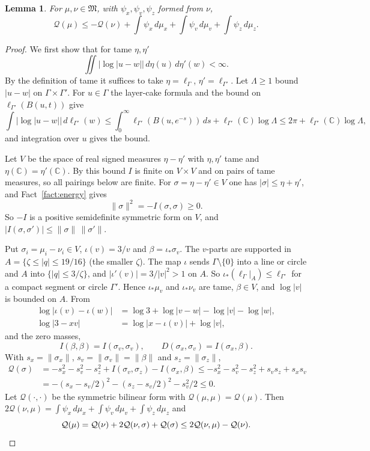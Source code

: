 \documentclass{amsart}
\newtheorem{lemma}{Lemma}[section]
\numberwithin{equation}{section}
\numberwithin{table}{section}
\begin{document}
\begin{lemma}\label{lem:concavity}
For $\mu,\nu\in\mathfrak M$, with $\psi_x,\psi_v,\psi_z$ formed from $\nu$,
\begin{equation}\label{eq:dual-inequality}
 \mathcal Q(\mu)\le-\mathcal Q(\nu)
            +\int\psi_x\,d\mu_x+\int\psi_v\,d\mu_v+\int\psi_z\,d\mu_z.
\end{equation}
\end{lemma}
\begin{proof}
We first show that for tame $\eta,\eta'$
\[
 \iint|\log|u-w||\,d\eta(u)\,d\eta'(w)<\infty.
\]
By the definition of tame it suffices to take $\eta=\ell_\Gamma$, $\eta'=\ell_{\Gamma'}$. Let
$\Lambda\ge1$ bound $|u-w|$ on $\Gamma\times\Gamma'$. For $u\in\Gamma$ the
layer-cake formula and the bound on $\ell_{\Gamma'}(B(u,t))$ give
\[
 \int|\log|u-w||\,d\ell_{\Gamma'}(w)
 \le\int_0^\infty\ell_{\Gamma'}(B(u,e^{-s}))\,ds+\ell_{\Gamma'}(\mathbb C)\log\Lambda
 \le2\pi+\ell_{\Gamma'}(\mathbb C)\log\Lambda,
\]
and integration over $u$ gives the bound.

Let $V$ be the space of real signed measures $\eta-\eta'$ with $\eta,\eta'$
tame and $\eta(\mathbb C)=\eta'(\mathbb C)$. By this bound $I$
is finite on $V\times V$ and on pairs of tame measures, so all pairings
below are finite. For $\sigma=\eta-\eta'\in V$ one has
$|\sigma|\le\eta+\eta'$, and Fact~\ref{fact:energy} gives
\[
 \|\sigma\|^2=-I(\sigma,\sigma)\ge0.
\]
So $-I$ is a positive semidefinite symmetric form on $V$, and
$|I(\sigma,\sigma')|\le\|\sigma\|\,\|\sigma'\|$.

Put $\sigma_i=\mu_i-\nu_i\in V$, $\iota(v)=3/v$ and $\beta=\iota_*\sigma_v$. The
$v$-parts are supported in $A=\{\zeta\le|q|\le19/16\}$ (the smaller
$\zeta$). The map $\iota$ sends $\Gamma\setminus\{0\}$ into a line or circle and
$A$ into $\{|q|\le3/\zeta\}$, and $|\iota'(v)|=3/|v|^2>1$ on $A$. So
$\iota_*(\ell_\Gamma|_A)\le\ell_{\Gamma'}$ for a compact segment or circle
$\Gamma'$. Hence $\iota_*\mu_v$ and $\iota_*\nu_v$ are tame, $\beta\in V$, and
$\log|v|$ is bounded on $A$. From
\begin{align*}
 \log|\iota(v)-\iota(w)|&=\log3+\log|v-w|-\log|v|-\log|w|,\\
 \log|3-xv|&=\log|x-\iota(v)|+\log|v|,
\end{align*}
and the zero masses,
\[
 I(\beta,\beta)=I(\sigma_v,\sigma_v),\qquad
 D(\sigma_x,\sigma_v)=I(\sigma_x,\beta).
\]
With $s_x=\|\sigma_x\|$, $s_v=\|\sigma_v\|=\|\beta\|$ and $s_z=\|\sigma_z\|$,
\begin{align*}
 \mathcal Q(\sigma)
 &=-s_x^2-s_v^2-s_z^2+I(\sigma_v,\sigma_z)-I(\sigma_x,\beta)
 \le-s_x^2-s_v^2-s_z^2+s_vs_z+s_xs_v\\
 &=-(s_x-s_v/2)^2-(s_z-s_v/2)^2-s_v^2/2\le0.
\end{align*}
Let $\mathcal Q(\cdot,\cdot)$ be the symmetric bilinear form with
$\mathcal Q(\mu,\mu)=\mathcal Q(\mu)$. Then
$2\mathcal Q(\nu,\mu)=\int\psi_x\,d\mu_x+\int\psi_v\,d\mu_v+\int\psi_z\,d\mu_z$
and
\[
 \mathcal Q(\mu)=\mathcal Q(\nu)+2\mathcal Q(\nu,\sigma)+\mathcal Q(\sigma)
 \le2\mathcal Q(\nu,\mu)-\mathcal Q(\nu).\qedhere
\]
\end{proof}
\end{document}
